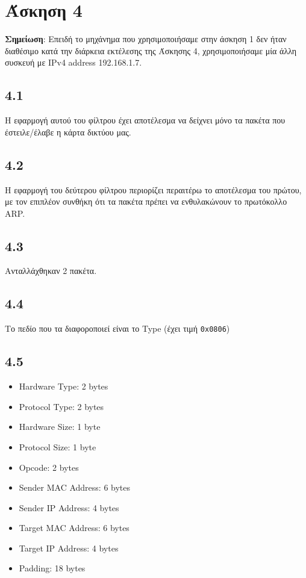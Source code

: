 	\section*{Άσκηση 4}
		\textbf{Σημείωση}: Επειδή το μηχάνημα που χρησιμοποιήσαμε στην άσκηση 1 δεν ήταν διαθέσιμο κατά την διάρκεια εκτέλεσης της Άσκησης 4, χρησιμοποιήσαμε μία άλλη συσκευή με IPv4 address 192.168.1.7.
		
		\subsection*{4.1}
			Η εφαρμογή αυτού του φίλτρου έχει αποτέλεσμα να δείχνει μόνο τα πακέτα που έστειλε/έλαβε η κάρτα δικτύου μας.
			
		
		\subsection*{4.2}
			Η εφαρμογή του δεύτερου φίλτρου περιορίζει περαιτέρω το αποτέλεσμα του πρώτου, με τον επιπλέον συνθήκη ότι τα πακέτα πρέπει να ενθυλακώνουν το πρωτόκολλο ARP.
		
		\subsection*{4.3}
			Ανταλλάχθηκαν 2 πακέτα.
		
		\subsection*{4.4}
			Το πεδίο που τα διαφοροποιεί είναι το Type (έχει τιμή \verb|0x0806|)
		
		\subsection*{4.5}
			\begin{itemize}
				\item Hardware Type: 2 bytes
				\item Protocol Type: 2 bytes 
				\item Hardware Size: 1 byte
				\item Protocol Size: 1 byte
				\item Opcode: 2 bytes
				\item Sender MAC Address: 6 bytes
				\item Sender IP Address: 4 bytes
				\item Target MAC Address: 6 bytes
				\item Target IP Address: 4 bytes
				\item Padding: 18 bytes				
			\end{itemize}
		
